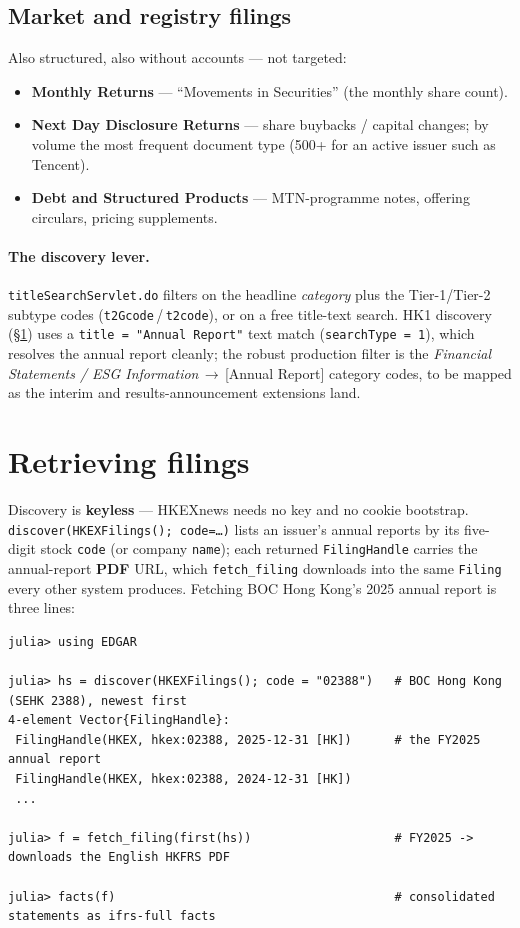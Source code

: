 \documentclass[11pt,a4paper]{report}
\begin{document}
\subsection{Market and registry filings}\label{sec:hk-forms-registry}
Also structured, also without accounts --- not targeted:
\begin{itemize}[nosep]
  \item \textbf{Monthly Returns} --- ``Movements in Securities'' (the monthly share count).
  \item \textbf{Next Day Disclosure Returns} --- share buybacks / capital changes; by volume the most frequent
    document type (500+ for an active issuer such as Tencent).
  \item \textbf{Debt and Structured Products} --- MTN-programme notes, offering circulars, pricing supplements.
\end{itemize}

\paragraph{The discovery lever.} \texttt{titleSearchServlet.do} filters on the headline \emph{category} plus the
Tier-1/Tier-2 subtype codes (\texttt{t2Gcode}\,/\,\texttt{t2code}), or on a free title-text search. HK1 discovery
(\S\ref{sec:hk-retrieve}) uses a \texttt{title\ =\ "Annual Report"} text match (\texttt{searchType\ =\ 1}),
which resolves the annual report cleanly; the robust production filter is the \emph{Financial Statements / ESG
Information}\,$\to$\,[Annual Report] category codes, to be mapped as the interim and results-announcement
extensions land.

\section{Retrieving filings}\label{sec:hk-retrieve}

Discovery is \textbf{keyless} --- HKEXnews needs no key and no cookie bootstrap. \texttt{discover(HKEXFilings();\
code=\ldots)} lists an issuer's annual reports by its five-digit stock \texttt{code} (or company \texttt{name});
each returned \texttt{FilingHandle} carries the annual-report \textbf{PDF} URL, which \texttt{fetch\_filing}
downloads into the same \texttt{Filing} every other system produces. Fetching BOC Hong Kong's 2025 annual report
is three lines:

\begin{lstlisting}
julia> using EDGAR

julia> hs = discover(HKEXFilings(); code = "02388")   # BOC Hong Kong (SEHK 2388), newest first
4-element Vector{FilingHandle}:
 FilingHandle(HKEX, hkex:02388, 2025-12-31 [HK])      # the FY2025 annual report
 FilingHandle(HKEX, hkex:02388, 2024-12-31 [HK])
 ...

julia> f = fetch_filing(first(hs))                    # FY2025 -> downloads the English HKFRS PDF

julia> facts(f)                                       # consolidated statements as ifrs-full facts
\end{lstlisting}
\end{document}

